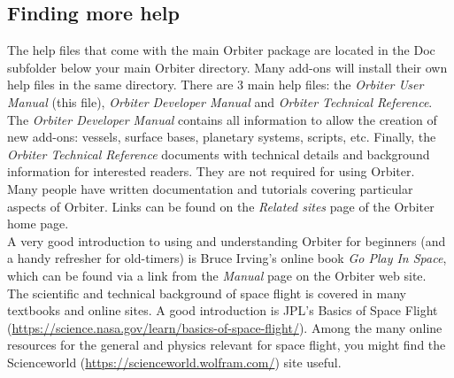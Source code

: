 \documentclass[Orbiter User Manual.tex]{subfiles}
\begin{document}
\subsection{Finding more help}
The help files that come with the main Orbiter package are located in the Doc subfolder below your main Orbiter directory. Many add-ons will install their own help files in the same directory. There are 3 main help files: the \textit{Orbiter User Manual} (this file), \textit{Orbiter Developer Manual} and \textit{Orbiter Technical Reference}.\\
The \textit{Orbiter Developer Manual} contains all information to allow the creation of new add-ons: vessels, surface bases, planetary systems, scripts, etc. Finally, the \textit{Orbiter Technical Reference} documents with technical details and background information for interested readers. They are not required for using Orbiter.\\
Many people have written documentation and tutorials covering particular aspects of Orbiter. Links can be found on the \textit{Related sites} page of the Orbiter home page.\\
A very good introduction to using and understanding Orbiter for beginners (and a handy refresher for old-timers) is Bruce Irving's online book \textit{Go Play In Space}, which can be found via a link from the \textit{Manual} page on the Orbiter web site.\\
The scientific and technical background of space flight is covered in many textbooks and online sites. A good introduction is JPL's Basics of Space Flight (\url{https://science.nasa.gov/learn/basics-of-space-flight/}). Among the many online resources for the general and physics relevant for space flight, you might find the Scienceworld (\url{https://scienceworld.wolfram.com/}) site useful.
\end{document}
